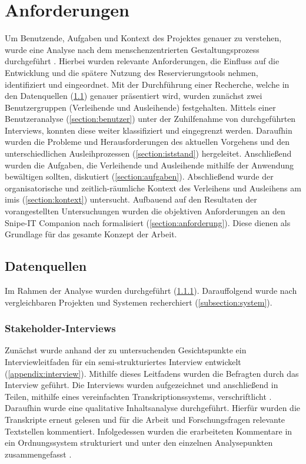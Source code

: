 \chapter{Anforderungen}
\label{chapter-analyse}

Um Benutzende, Aufgaben und Kontext des Projektes genauer zu verstehen, wurde eine Analyse nach dem
menschenzentrierten Gestaltungsprozess durchgeführt \cite{DINISO9241}.
Hierbei wurden relevante Anforderungen, die Einfluss auf die Entwicklung und die spätere Nutzung des
Reservierungstools nehmen, identifiziert und eingeordnet. Mit der Durchführung einer Recherche,
welche in den Datenquellen (\ref{section:daten}) genauer präsentiert wird, wurden zunächst zwei
Benutzergruppen (Verleihende und Ausleihende) festgehalten. Mittels einer Benutzeranalyse
(\ref{section:benutzer}) unter der Zuhilfenahme von durchgeführten Interviews, konnten diese weiter
klassifiziert und eingegrenzt werden. Daraufhin wurden die Probleme und Herausforderungen des
aktuellen Vorgehens und den unterschiedlichen Ausleihprozessen (\ref{section:iststand}) hergeleitet.
Anschließend wurden die Aufgaben, die Verleihende und Ausleihende mithilfe der Anwendung bewältigen
sollten, diskutiert (\ref{section:aufgaben}). Abschließend wurde der organisatorische und
zeitlich-räumliche Kontext des Verleihens und Ausleihens am \ac{imis} (\ref{section:kontext})
untersucht. Aufbauend auf den Resultaten der vorangestellten Untersuchungen wurden die objektiven
Anforderungen an den Snipe-IT Companion nach  formalisiert
(\ref{section:anforderung}). Diese dienen als Grundlage für das gesamte Konzept der Arbeit.

\section{Datenquellen}
\label{section:daten}
Im Rahmen der Analyse wurden  durchgeführt
(\ref{subsection:interview}). Darauffolgend wurde nach vergleichbaren Projekten und Systemen
recherchiert (\ref{subsection:system}).

\subsection{Stakeholder-Interviews}
\label{subsection:interview}
Zunächst wurde anhand der zu untersuchenden Gesichtspunkte ein Interviewleitfaden für ein
semi-strukturiertes Interview entwickelt (\ref{appendix:interview}). Mithilfe dieses
Leitfadens wurden die Befragten durch das Interview geführt. Die Interviews wurden aufgezeichnet und
anschließend in Teilen, mithilfe eines vereinfachten Transkriptionssystems, verschriftlicht
\cite{dresing_praxisbuch_2016}. Daraufhin wurde eine qualitative Inhaltsanalyse durchgeführt.
Hierfür wurden die Transkripte erneut gelesen und für die Arbeit und Forschungsfragen relevante
Textstellen kommentiert. Infolgedessen wurden die erarbeiteten Kommentare in ein Ordnungssystem
strukturiert und unter den einzelnen Analysepunkten zusammengefasst \cite{dresing_praxisbuch_2016}.

